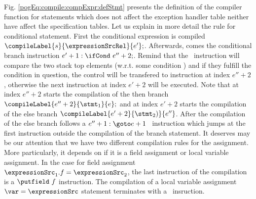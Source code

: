 Fig. \ref{pogEq:compile:compExpr:defStmt} presents the definition 
of the compiler function for statements which does not affect the exception handler table 
neither have affect the specification tables.
Let us explain in more detail the rule for 
conditional statement. First the conditional expression is compiled $\compileLabel{s}{\expressionSrcRel}{e'};$.
Afterwards, comes the conditional branch instruction $e' + 1: \ifCond \ e'' + 2;$. Remind that the \ifCond \ 
instruction will compare the two stack top elements  (w.r.t. some condition ) and if they fulfill the condition
in question, the control will be transfered to instruction at index $ e'' +2 $, otherwise the next instruction
at index $e' + 2$ will be executed. Note that at index $ e''+2$ starts the compilation of the then branch 
$\compileLabel{e'' +  2}{\stmt_1}{ e  };$ and at index $ e'+2$ starts the compilation of the else branch 
$\compileLabel{e' + 2}{\stmt_2)}{e''}$. After the compilation of the else branch follows a $ e'' + 1: \goto e + 1$ \ instruction
which jumps at the first instruction  outside the compilation of the branch statement. 
 It deserves may be our attention  that
we have two different compilation rules for the assignment. More particularly, it depends on if it is a  field assignment or
local variable assignment.  In the case for field assignment $ \expressionSrc_1.f= \expressionSrc_2$,
the last instruction of the compilation is a $\putfield \ f$ instruction. The compilation of a
 local variable assignment $ \var = \expressionSrc$ statement terminates with a \store \ insruction.





